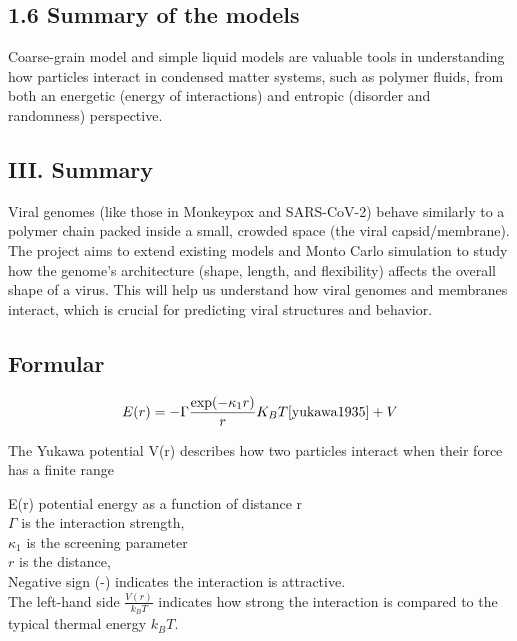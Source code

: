 \documentclass[12pt]{article}
\begin{document}
\begin{flushleft}
\subsection*{1.6 Summary of the models}
Coarse-grain model and simple liquid models are valuable tools in understanding how particles interact in condensed matter systems, such as polymer fluids, from both an energetic (energy of interactions) and entropic (disorder and randomness) perspective.







\subsection*{III. Summary}
Viral genomes (like those in Monkeypox and SARS-CoV-2) behave similarly to a polymer chain packed inside a small, crowded space (the viral capsid/membrane). The project aims to extend existing models and Monto Carlo simulation to study how the genome's architecture (shape, length, and flexibility) affects the overall shape of a virus. This will help us understand how viral genomes and membranes interact, which is crucial for predicting viral structures and behavior.



\subsection*{Formular}

\begin{equation}
E(r) = -\Gamma \frac{\exp(-\kappa_1 r)}{r} K_B T\cite{yukawa1935} +V
\end{equation}

The Yukawa potential V(r) describes how two particles interact when their force has a finite range

E(r) potential energy as a function of distance r\\
\(\Gamma\) is the interaction strength,\\
\(\kappa_1\) is the screening parameter \\
\(r\) is the distance, \\
Negative sign (-) indicates the interaction is attractive.\\
The left-hand side \( \frac{V(r)}{k_B T} \) indicates how strong the interaction is compared to the typical thermal energy \( k_B T \).\\


\end{flushleft}
\end{document}
